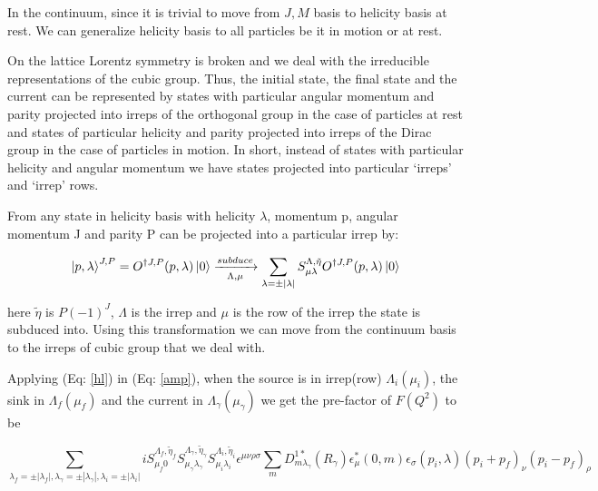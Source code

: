 \documentclass[10pt]{article}
\begin{document}
\par
In the continuum, since it is trivial to move from $J,M$ basis to helicity basis at rest. We can generalize helicity basis to all particles be it in motion or at rest. \par
On the lattice Lorentz symmetry is broken and we deal with the irreducible representations of the cubic group. Thus, the initial state, the final state and the current can be represented by states with particular angular momentum and parity projected into irreps of the orthogonal group in the case of particles at rest and states of particular helicity and parity projected into irreps of the Dirac group in the case of particles in motion. In short, instead of states with particular helicity and angular momentum we have states projected into particular `irreps' and `irrep' rows. \par 
From \cite{hel} any state in helicity basis with helicity $\lambda$, momentum p, angular momentum J and parity P can be projected into a particular irrep by:

\begin{equation}
\label{hl}
\ket{p,\lambda}^{J,P} = O^{\dagger J,P}(p,\lambda)\ket{0} \xrightarrow[\Lambda, \mu]{subduce} \sum_{\lambda = \pm|\lambda| } S^{ \Lambda,\tilde{\eta}  }_{\mu\lambda} O^{\dagger J,P}(p,\lambda)\ket{0}
\end{equation}

here $\tilde{\eta}$ is $P(-1)^{J}$, $\Lambda$ is the irrep and $\mu$ is the row of the irrep the state is subduced into. Using this transformation we can move from the continuum basis to the irreps of cubic group that we deal with. \par
Applying (Eq: \ref{hl}) in (Eq: \ref{amp}), when the source is in irrep(row) $\Lambda_i (\mu_i) $, the sink in $\Lambda_f (\mu_f) $ and the current in $\Lambda_\gamma (\mu_\gamma) $ we get the pre-factor of $F(Q^2)$ to be

\begin{equation}
\label{fnl}
\sum_{\lambda_{f} = \pm|\lambda_{f}| ,\lambda_{\gamma} = \pm|\lambda_{\gamma}| , \lambda_i = \pm|\lambda_i| } i S^{ \Lambda_f,\tilde{\eta}_f  }_{\mu_f 0}  S^{ \Lambda_{\gamma},\tilde{\eta}_{\gamma}  }_{\mu_{\gamma} \lambda_{\gamma} } S^{ \Lambda_i,\tilde{\eta}_i  }_{\mu_i\lambda_i}\epsilon^{\mu\nu\rho\sigma}\sum_{m}D^{1*}_{m\lambda_{\gamma}}(R_\gamma)\epsilon^{*}_{\mu}(0, m)\epsilon_{\sigma}(p_i, \lambda)(p_i + p_f)_{\nu}(p_i - p_f)_{\rho}
\end{equation}
\end{document}
